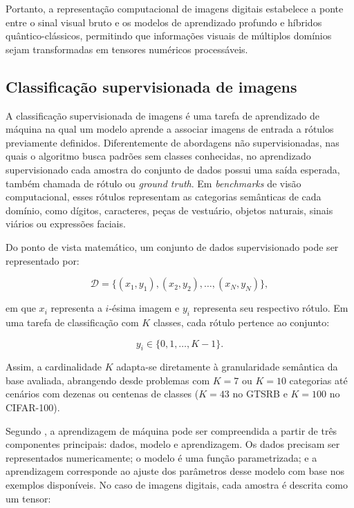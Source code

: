 \documentclass[
    12pt,
    openright,
    oneside,
    a4paper,
    english,
    brazil
]{abntex2}
\begin{document}
Portanto, a representação computacional de imagens digitais estabelece a ponte entre o sinal visual bruto e os modelos de aprendizado profundo e híbridos quântico-clássicos, permitindo que informações visuais de múltiplos domínios sejam transformadas em tensores numéricos processáveis.

\subsection{Classificação supervisionada de imagens}
\label{subsec:classificacao_supervisionada_imagens}

A classificação supervisionada de imagens é uma tarefa de aprendizado de máquina na qual um modelo aprende a associar imagens de entrada a rótulos previamente definidos. Diferentemente de abordagens não supervisionadas, nas quais o algoritmo busca padrões sem classes conhecidas, no aprendizado supervisionado cada amostra do conjunto de dados possui uma saída esperada, também chamada de rótulo ou \textit{ground truth}. Em \textit{benchmarks} de visão computacional, esses rótulos representam as categorias semânticas de cada domínio, como dígitos, caracteres, peças de vestuário, objetos naturais, sinais viários ou expressões faciais.

Do ponto de vista matemático, um conjunto de dados supervisionado pode ser representado por:

\[
\mathcal{D} =
\{(x_1,y_1),(x_2,y_2),\ldots,(x_N,y_N)\},
\]

em que \(x_i\) representa a \(i\)-ésima imagem e \(y_i\) representa seu respectivo rótulo. Em uma tarefa de classificação com \(K\) classes, cada rótulo pertence ao conjunto:

\[
y_i \in \{0,1,\ldots,K-1\}.
\]

Assim, a cardinalidade \(K\) adapta-se diretamente à granularidade semântica da base avaliada, abrangendo desde problemas com \(K=7\) ou \(K=10\) categorias até cenários com dezenas ou centenas de classes (\(K=43\) no GTSRB e \(K=100\) no CIFAR-100).

Segundo , a aprendizagem de máquina pode ser compreendida a partir de três componentes principais: dados, modelo e aprendizagem. Os dados precisam ser representados numericamente; o modelo é uma função parametrizada; e a aprendizagem corresponde ao ajuste dos parâmetros desse modelo com base nos exemplos disponíveis. No caso de imagens digitais, cada amostra é descrita como um tensor:
\end{document}
